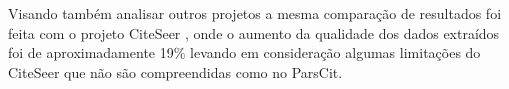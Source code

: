 Visando também analisar outros projetos a mesma comparação de resultados foi feita com o projeto CiteSeer \cite{citeseer}, onde o aumento da qualidade dos dados extraídos foi de aproximadamente 19\% levando em consideração algumas limitações do CiteSeer que não são compreendidas como no ParsCit.


	
